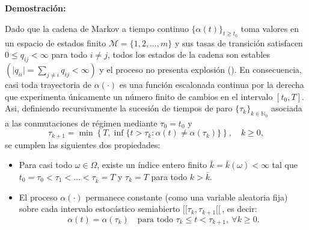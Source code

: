 \documentclass[
  spanish,
  us-letterpaper,
]{scrreprt}
\providecommand{\tightlist}{%
  \setlength{\itemsep}{0pt}\setlength{\parskip}{0pt}}
\numberwithin{equation}{section}
\theoremstyle{plain}
\theoremstyle{plain}
\theoremstyle{plain}
\theoremstyle{definition}
\theoremstyle{remark}
\begin{document}
\textbf{Demostración:}

Dado que la cadena de Markov a tiempo continuo
\(\{\alpha(t)\}_{t \ge t_0}\) toma valores en un espacio de estados
finito \(\mathcal{M} = \{1, 2, \dots, m\}\) y sus tasas de transición
satisfacen \(0 \le q_{ij} < \infty\) para todo \(i \neq j\), todos los
estados de la cadena son estables
\(\left( \displaystyle \vert q_{ii} \vert = \sum_{j \neq i} q_{ij} < \infty \right)\)
y el proceso no presenta explosión (). En consecuencia, casi toda trayectoria de
\(\alpha(\cdot)\) es una función escalonada continua por la derecha que
experimenta únicamente un número finito de cambios en el intervalo
\([t_0, T]\). Asi, definiendo recursivamente la sucesión de tiempos de
paro \(\{\tau_k\}_{k \in \mathbb{N}_0}\) asociada a las conmutaciones de
régimen mediante \(\tau_0 = t_0\) y \[
\tau_{k+1} = \min\left\{T, \inf\{t > \tau_k : \alpha(t) \neq \alpha(\tau_k)\}\right\}, \quad k \ge 0,
\] se cumplen las siguientes dos propiedades:

\begin{itemize}
\tightlist
\item
  Para casi todo \(\omega \in \Omega\), existe un índice entero finito
  \(\bar{k} = \bar{k}(\omega) < \infty\) tal que
  \(t_0 = \tau_0 < \tau_1 < \dots < \tau_{\bar{k}} = T\) y
  \(\tau_k = T\) para todo \(k > \bar{k}\).
\item
  El proceso \(\alpha(\cdot)\) permanece constante (como una variable
  aleatoria fija) sobre cada intervalo estocástico semiabierto
  \([[\tau_k, \tau_{k+1}[[\,\), es decir: \[
  \alpha(t) = \alpha(\tau_k) \quad \text{para todo } \tau_k \le t < \tau_{k+1}, \ \forall k \ge 0.
  \]
\end{itemize}
\end{document}
